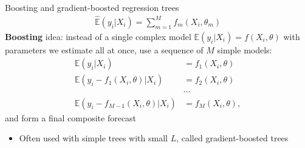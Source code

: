 \documentclass[xcolor=table, aspectratio=169]{beamer}
\newcommand{\alertbf}[1]{\alert{\textbf{#1}}}
\newcommand{\E}{\mathbb{E}}
\begin{document}
\begin{frame}[t]{Boosting and gradient-boosted regression trees}
\vspace{-12pt}
\begin{align*}
    \hat{\E}(y_i | X_i) = \sum_{m=1}^M f_m(X_i,\theta_m) 
\end{align*}
    \alertbf{Boosting} idea: instead of a single complex model $\E( y_i | X_i) = f(X_i,\theta)$ with parameters we estimate all at once, use a sequence of $M$ simple models:
    \begin{align*}
        \E( y_i | X_i) &= f_1(X_i,\theta) \\
        \E( y_i - f_1(X_i,\theta) | X_i) &= f_2(X_i,\theta) \\
        &\cdots \\
        \E( y_i - f_{M-1}(X_i,\theta) | X_i) &= f_M(X_i,\theta),
    \end{align*}
    and form a final composite forecast
    \begin{itemize}
        \item Often used with simple trees with small $L$, called gradient-boosted trees
    \end{itemize}
\end{frame}
\end{document}
